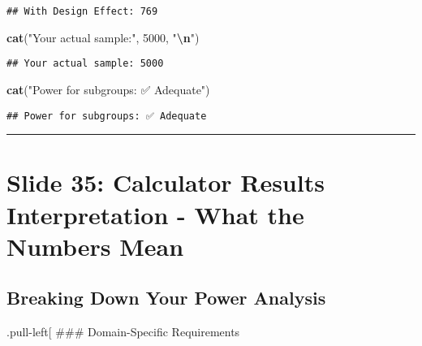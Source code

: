 \documentclass[
]{article}
\newenvironment{Shaded}{\begin{snugshade}}{\end{snugshade}}
\newcommand{\DecValTok}[1]{\textcolor[rgb]{0.00,0.00,0.81}{#1}}
\newcommand{\FunctionTok}[1]{\textcolor[rgb]{0.13,0.29,0.53}{\textbf{#1}}}
\newcommand{\NormalTok}[1]{#1}
\newcommand{\SpecialCharTok}[1]{\textcolor[rgb]{0.81,0.36,0.00}{\textbf{#1}}}
\newcommand{\StringTok}[1]{\textcolor[rgb]{0.31,0.60,0.02}{#1}}
\begin{document}
\begin{verbatim}
## With Design Effect: 769
\end{verbatim}

\begin{Shaded}
\begin{Highlighting}[]
\FunctionTok{cat}\NormalTok{(}\StringTok{"Your actual sample:"}\NormalTok{, }\DecValTok{5000}\NormalTok{, }\StringTok{"}\SpecialCharTok{\textbackslash{}n}\StringTok{"}\NormalTok{)}
\end{Highlighting}
\end{Shaded}

\begin{verbatim}
## Your actual sample: 5000
\end{verbatim}

\begin{Shaded}
\begin{Highlighting}[]
\FunctionTok{cat}\NormalTok{(}\StringTok{"Power for subgroups: ✅ Adequate"}\NormalTok{)}
\end{Highlighting}
\end{Shaded}

\begin{verbatim}
## Power for subgroups: ✅ Adequate
\end{verbatim}

\begin{center}\rule{0.5\linewidth}{0.5pt}\end{center}

\section{Slide 35: Calculator Results Interpretation - What the Numbers
Mean}\label{slide-35-calculator-results-interpretation---what-the-numbers-mean}

\subsection{Breaking Down Your Power
Analysis}\label{breaking-down-your-power-analysis}

.pull-left{[} \#\#\# Domain-Specific Requirements
\end{document}
